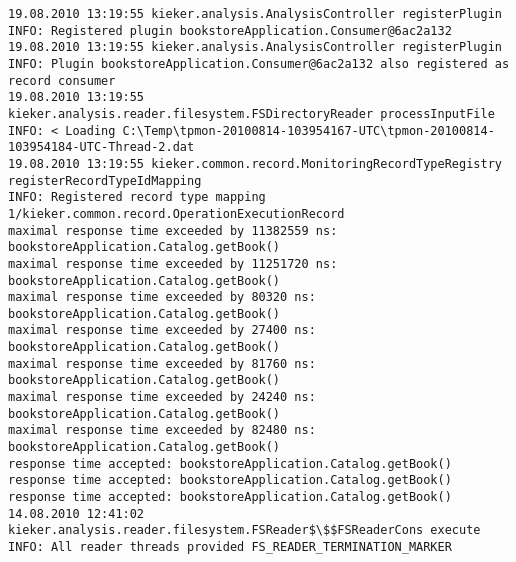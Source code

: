 \setTextListing
\begin{lstlisting}[caption=Execution of the example analysis (Section~\ref{sec:example:analysis})]
19.08.2010 13:19:55 kieker.analysis.AnalysisController registerPlugin
INFO: Registered plugin bookstoreApplication.Consumer@6ac2a132
19.08.2010 13:19:55 kieker.analysis.AnalysisController registerPlugin
INFO: Plugin bookstoreApplication.Consumer@6ac2a132 also registered as record consumer
19.08.2010 13:19:55 kieker.analysis.reader.filesystem.FSDirectoryReader processInputFile
INFO: < Loading C:\Temp\tpmon-20100814-103954167-UTC\tpmon-20100814-103954184-UTC-Thread-2.dat
19.08.2010 13:19:55 kieker.common.record.MonitoringRecordTypeRegistry registerRecordTypeIdMapping
INFO: Registered record type mapping 1/kieker.common.record.OperationExecutionRecord
maximal response time exceeded by 11382559 ns: bookstoreApplication.Catalog.getBook()
maximal response time exceeded by 11251720 ns: bookstoreApplication.Catalog.getBook()
maximal response time exceeded by 80320 ns: bookstoreApplication.Catalog.getBook()
maximal response time exceeded by 27400 ns: bookstoreApplication.Catalog.getBook()
maximal response time exceeded by 81760 ns: bookstoreApplication.Catalog.getBook()
maximal response time exceeded by 24240 ns: bookstoreApplication.Catalog.getBook()
maximal response time exceeded by 82480 ns: bookstoreApplication.Catalog.getBook()
response time accepted: bookstoreApplication.Catalog.getBook()
response time accepted: bookstoreApplication.Catalog.getBook()
response time accepted: bookstoreApplication.Catalog.getBook()
14.08.2010 12:41:02 kieker.analysis.reader.filesystem.FSReader$\$$FSReaderCons execute
INFO: All reader threads provided FS_READER_TERMINATION_MARKER
\end{lstlisting}
